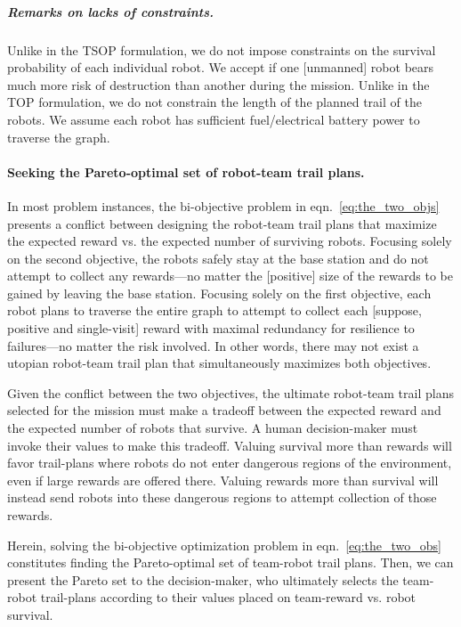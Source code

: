\documentclass[11pt, oneside]{article}
\begin{document}
\subparagraph{Remarks on lacks of constraints.} 
Unlike in the TSOP formulation, we do not impose constraints on the survival probability of each individual robot. We accept if one [unmanned] robot bears much more risk of destruction than another during the mission. 
Unlike in the TOP formulation, we do not constrain the length of the planned trail of the robots. We assume each robot has sufficient fuel/electrical battery power to traverse the graph.


\paragraph{Seeking the Pareto-optimal set of robot-team trail plans.} 
In most problem instances, the bi-objective problem in eqn.~\ref{eq:the_two_objs} presents a conflict between designing the robot-team trail plans that maximize the expected reward vs. the expected number of surviving robots. 
Focusing solely on the second objective, the robots safely stay at the base station and do not attempt to collect any rewards---no matter the [positive] size of the rewards to be gained by leaving the base station. 
Focusing solely on the first objective, each robot plans to traverse the entire graph to attempt to collect each [suppose, positive and single-visit] reward with maximal redundancy for resilience to failures---no matter the risk involved.
In other words, there may not exist a utopian robot-team trail plan that simultaneously maximizes both objectives. 

Given the conflict between the two objectives, the ultimate robot-team trail plans selected for the mission must make a tradeoff between the expected reward and the expected number of robots that survive. 
A human decision-maker must invoke their values to make this tradeoff.
Valuing survival more than rewards will favor trail-plans where robots do not enter dangerous regions of the environment, even if large rewards are offered there. Valuing rewards more than survival will instead send robots into these dangerous regions to attempt collection of those rewards. 

Herein, solving the bi-objective optimization problem in eqn.~\ref{eq:the_two_obs} constitutes finding the Pareto-optimal set of team-robot trail plans. Then, we can present the Pareto set to the decision-maker, who ultimately selects the team-robot trail-plans according to their values placed on team-reward vs. robot survival. 
\end{document}
